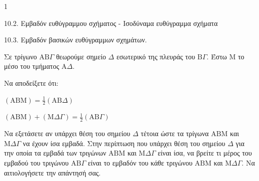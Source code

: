 \begin{ylh}{1}
    \item 10.2. Εμβαδόν ευθύγραμμου σχήματος - Ισοδύναμα ευθύγραμμα σχήματα
    \item 10.3. Εμβαδόν βασικών ευθύγραμμων σχημάτων.
\end{ylh}
Σε τρίγωνο $\mathrm{AB}\Gamma$ θεωρούμε σημείο $\Delta$ εσωτερικό της πλευράς του $\mathrm{B}\Gamma$. Έστω $\mathrm{M}$ το μέσο του τμήματος $\mathrm{A}\Delta$.
\begin{alist}
\item Να αποδείξετε ότι:
    \begin{rlist}
    \item $(\mathrm{ABM}) = \frac{1}{2}(\mathrm{AB}\Delta)$ 
    \item $(\mathrm{ABM}) + (\mathrm{M}\Delta\Gamma) = \frac{1}{2}(\mathrm{AB}\Gamma)$ 
    \end{rlist}
\item Να εξετάσετε αν υπάρχει θέση του σημείου $\Delta$ τέτοια ώστε τα τρίγωνα $\mathrm{ABM}$ και $\mathrm{M}\Delta\Gamma$ να έχουν ίσα εμβαδά. Στην περίπτωση που υπάρχει θέση του σημείου $\Delta$ για την οποία τα εμβαδά των τριγώνων $\mathrm{ABM}$ και $\mathrm{M}\Delta\Gamma$ είναι ίσα, να βρείτε τι μέρος του εμβαδού του τριγώνου $\mathrm{AB}\Gamma$ είναι το εμβαδόν του κάθε τριγώνου $\mathrm{ABM}$ και $\mathrm{M}\Delta\Gamma$. Να αιτιολογήσετε την απάντησή σας. 
\end{alist}